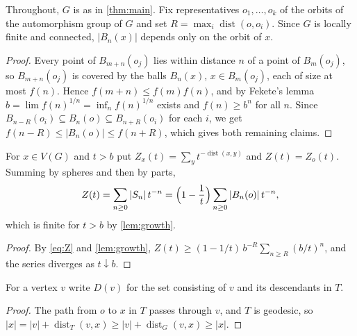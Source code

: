 \documentclass[11pt]{amsart}
\newtheorem{lemma}[theorem]{Lemma}
\theoremstyle{remark}
\DeclareMathOperator{\dist}{dist}
\begin{document}
Throughout, $G$ is as in \cref{thm:main}. Fix representatives $o_1,\dots,o_k$ of the orbits of the automorphism group of $G$ and set $R=\max_i\dist(o,o_i)$. Since $G$ is locally finite and connected, $|B_n(x)|$ depends only on the orbit of $x$.


\begin{proof}
Every point of $B_{m+n}(o_j)$ lies within distance $n$ of a point of $B_m(o_j)$, so $B_{m+n}(o_j)$ is covered by the balls $B_n(x)$, $x\in B_m(o_j)$, each of size at most $f(n)$. Hence $f(m+n)\le f(m)f(n)$, and by Fekete's lemma \cite{Fekete1923} $b=\lim f(n)^{1/n}=\inf_n f(n)^{1/n}$ exists and $f(n)\ge b^n$ for all $n$. Since $B_{n-R}(o_i)\subseteq B_n(o)\subseteq B_{n+R}(o_i)$ for each $i$, we get $f(n-R)\le|B_n(o)|\le f(n+R)$, which gives both remaining claims.
\end{proof}

For $x\in V(G)$ and $t>b$ put $Z_x(t)=\sum_{y}t^{-\dist(x,y)}$ and $Z(t)=Z_o(t)$. Summing by spheres and then by parts,
\begin{equation}\label{eq:Z}
Z(t)=\sum_{n\ge0}|S_n|\,t^{-n}=\Bigl(1-\frac1t\Bigr)\sum_{n\ge0}|B_n(o)|\,t^{-n},
\end{equation}
which is finite for $t>b$ by \cref{lem:growth}.


\begin{proof}
By \eqref{eq:Z} and \cref{lem:growth}, $Z(t)\ge(1-1/t)\,b^{-R}\sum_{n\ge R}(b/t)^n$, and the series diverges as $t\downarrow b$.
\end{proof}

For a vertex $v$ write $D(v)$ for the set consisting of $v$ and its descendants in $T$.


\begin{proof}
The path from $o$ to $x$ in $T$ passes through $v$, and $T$ is geodesic, so $|x|=|v|+\dist_T(v,x)\ge|v|+\dist_G(v,x)\ge|x|$.
\end{proof}
\end{document}
